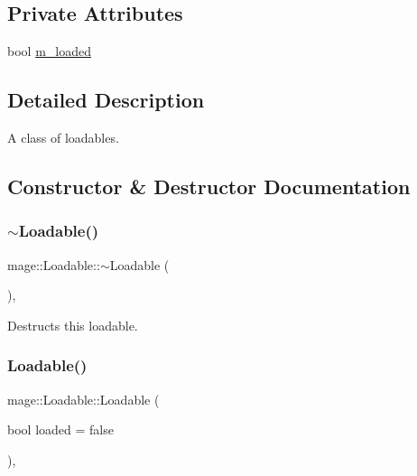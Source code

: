 \subsection*{Private Attributes}
\begin{DoxyCompactItemize}
\item 
bool \hyperlink{classmage_1_1_loadable_a993963fbfeb0f2e2ab9616bf7ef6a0f7}{m\+\_\+loaded}
\end{DoxyCompactItemize}


\subsection{Detailed Description}
A class of loadables. 

\subsection{Constructor \& Destructor Documentation}
\hypertarget{classmage_1_1_loadable_a8088935f7536c0c77ddb34a29ece63b1}{}\label{classmage_1_1_loadable_a8088935f7536c0c77ddb34a29ece63b1} 
\subsubsection{\texorpdfstring{$\sim$\+Loadable()}{~Loadable()}}
{\footnotesize\ttfamily mage\+::\+Loadable\+::$\sim$\+Loadable (\begin{DoxyParamCaption}{ }\end{DoxyParamCaption})\hspace{0.3cm}{\ttfamily [virtual]}, {\ttfamily [default]}}

Destructs this loadable. \hypertarget{classmage_1_1_loadable_afbdcb287b5e20583899a27a1c244bc7d}{}\label{classmage_1_1_loadable_afbdcb287b5e20583899a27a1c244bc7d} 
\subsubsection{\texorpdfstring{Loadable()}{Loadable()}\hspace{0.1cm}{\footnotesize\ttfamily [1/3]}}
{\footnotesize\ttfamily mage\+::\+Loadable\+::\+Loadable (\begin{DoxyParamCaption}\item[{bool}]{loaded = {\ttfamily false} }\end{DoxyParamCaption})\hspace{0.3cm}{\ttfamily [explicit]}, {\ttfamily [protected]}}

